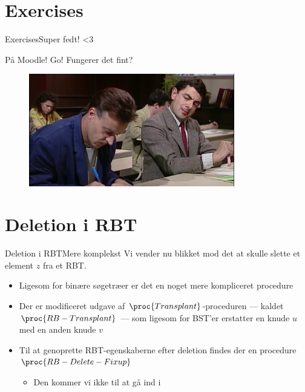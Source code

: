 \documentclass[aspectratio=1610]{beamer}
\begin{document}
\section{Exercises}

\begin{frame}{Exercises}{Super fedt! <3}

    På Moodle! Go! Fungerer det fint?

    \begin{figure}[h]
        \centering
        \includegraphics[width=0.8\textwidth]{../exercises}
    \end{figure}
    
\end{frame}


\section{Deletion i RBT}

\begin{frame}{Deletion i RBT}{Mere komplekst}
    Vi vender nu blikket mod det at skulle slette et element $z$ fra et RBT.

    \begin{itemize}[<+(1)->]
        \item Ligesom for binære søgetræer er det en noget mere kompliceret
            procedure
        \item Der er modificeret udgave af $\proc{Transplant}$-proceduren ---
            kaldet $\proc{RB-Transplant}$ --- som ligesom for BST'er erstatter
            en knude $u$ med en anden knude $v$
        \item Til at genoprette RBT-egenskaberne efter deletion findes der en
            procedure $\proc{RB-Delete-Fixup}$
            \begin{itemize}
                \item Den kommer vi ikke til at gå ind i
            \end{itemize}
    \end{itemize}
\end{frame}
\end{document}
